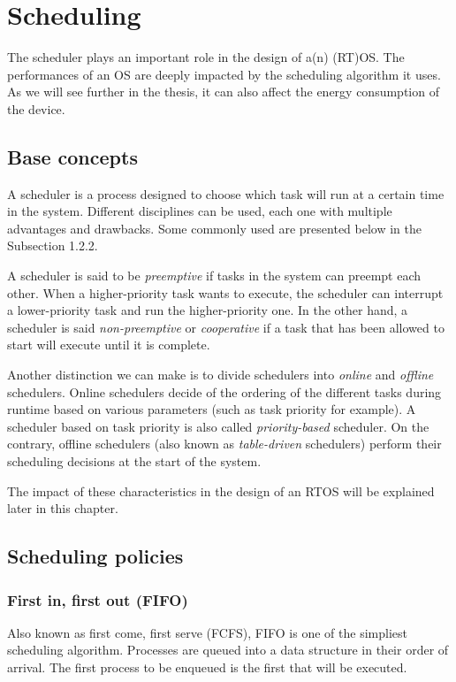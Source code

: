 \section{Scheduling}

The scheduler plays an important role in the design of a(n) (RT)OS.
The performances of an OS are deeply impacted by the scheduling algorithm it uses.
As we will see further in the thesis, it can also affect the energy consumption of the device.\\

\subsection{Base concepts}

A scheduler is a process designed to choose which task will run at a certain time in the system.
Different disciplines can be used, each one with multiple advantages and drawbacks.
Some commonly used are presented below in the Subsection 1.2.2.

A scheduler is said to be \textit{preemptive} if tasks in the system can preempt each other.
When a higher-priority task wants to execute, the scheduler can interrupt a lower-priority task and run the higher-priority one.
In the other hand, a scheduler is said \textit{non-preemptive} or \textit{cooperative}
    if a task that has been allowed to start will execute until it is complete.

Another distinction we can make is to divide schedulers into \textit{online} and \textit{offline} schedulers.
Online schedulers decide of the ordering of the different tasks during runtime based on various parameters (such as task priority for example).
A scheduler based on task priority is also called \textit{priority-based} scheduler.
On the contrary, offline schedulers (also known as \textit{table-driven} schedulers) perform their scheduling decisions at the start of the system.

The impact of these characteristics in the design of an RTOS will be explained later in this chapter.

\subsection{Scheduling policies}

\subsubsection{First in, first out (FIFO)}
Also known as first come, first serve (FCFS), FIFO is one of the simpliest scheduling algorithm.
Processes are queued into a data structure in their order of arrival.
The first process to be enqueued is the first that will be executed.

